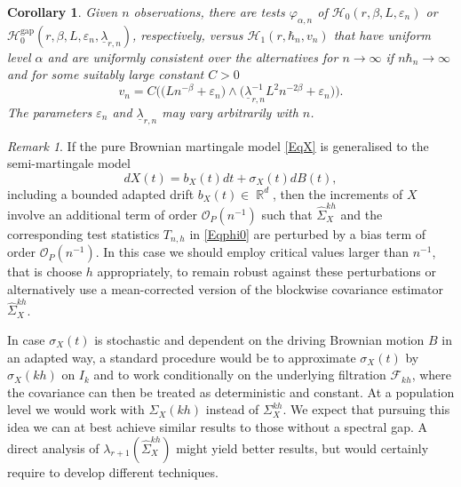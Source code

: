 \documentclass[preprint,aos]{imsart}
\numberwithin{equation}{section}
\newtheorem{corollary}[satz]{Corollary}
\theoremstyle{remark}
\newtheorem{remark}[satz]{Remark}
\DeclareMathOperator{\R}{{\mathbb R}}
\providecommand{\eps}{\varepsilon}
\renewcommand{\phi}{\varphi}
\renewcommand{\subset}{\subseteq}
\renewcommand{\ge}{\geqslant}
\begin{document}
\begin{corollary}
Given $n$ observations, there are  tests $\phi_{\alpha,n}$ of ${\mathcal H}_0(r,\beta,L,\eps_n)$ or ${\mathcal H}_0^{\text{gap}}(r,\beta,L,\eps_n,\underline\lambda_{r,n})$, respectively, versus ${\mathcal H}_1(r,\hbar_n,v_n)$ that have uniform level $\alpha$  and are uniformly consistent over the alternatives for $n\to\infty$ if $n\hbar_n\to\infty$ and for some suitably large constant $C>0$
\[ v_n=C\Big(\big(Ln^{-\beta}+\eps_n\big)\wedge \big(\underline\lambda_{r,n}^{-1}L^2n^{-2\beta}+\eps_n\big) \Big).\]
The parameters $\eps_n$ and $\underline\lambda_{r,n}$  may vary arbitrarily with $n$.
\end{corollary}

\begin{comment}
\begin{proof}
For each $n$ consider the test $\phi_{\alpha,n}$ with blocksize $h_n=C_1n^{-1}$ for some suitably large $C_1>0$ and critical value $\kappa_{\alpha,n}\thicksim (\underline\lambda_{r,n}^{-1}L_n^2n^{-2\beta_n})\wedge L_nn^{-\beta_n}$ according to the minimum of \eqref{EqKappaNoGap} and \eqref{EqKappaWithGap}. In view of ${\mathcal H}_0([0,1],\beta_n,L_n,r,\underline\lambda_{r,n})\subset {\mathcal H}_0([0,1],\beta_n,L_n,r,0)$ Theorem \ref{ThmNoNoise} shows that this test has uniform and non-asymptotic level $\alpha$. Theorem \ref{ThmPower} then shows (for sufficiently large $C_1,C_2>0$) that asymptotically these tests are uniformly consistent under alternatives ${\mathcal H}_1(r,h_n',v_n)$ for $v_n\ge C_2\kappa_{\alpha,n}$.
\end{proof}
\end{comment}

\begin{remark}\label{RemDrift}
If the pure Brownian martingale model \eqref{EqX} is generalised to the semi-martingale model
\[ dX(t)=b_X(t)dt+\sigma_X(t)dB(t),\]
including a bounded adapted drift $b_X(t)\in\R^d$, then the increments of $X$ involve an additional term of order ${\mathcal O}_P(n^{-1})$ such that $\hat\Sigma_X^{kh}$ and the corresponding test statistics $T_{n,h}$ in \eqref{Eqphi0} are perturbed by a bias term of order ${\mathcal O}_P(n^{-1})$. In this case we should employ critical values larger than $n^{-1}$, that is choose $h$ appropriately, to remain robust against these perturbations or alternatively use a mean-corrected version of the blockwise covariance estimator $\hat\Sigma_X^{kh}$.

In case $\sigma_X(t)$ is stochastic and dependent on the driving Brownian motion $B$ in an adapted way, a standard procedure would be to approximate $\sigma_X(t)$ by $\sigma_X(kh)$ on $I_k$ and  to work conditionally on the underlying filtration ${\mathcal F}_{kh}$, where the covariance can then be treated as deterministic and constant. At a population level we would work with $\Sigma_X(kh)$ instead of $\Sigma_X^{kh}$. We expect that pursuing this idea we can at best achieve similar results to those without a spectral gap. A direct analysis of $\lambda_{r+1}(\hat\Sigma_X^{kh})$ might yield better results, but would certainly require to develop different techniques.
\end{remark}
\end{document}
